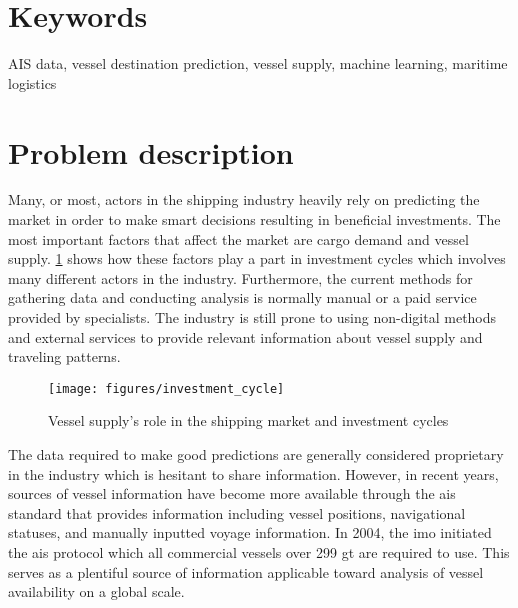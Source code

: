 \section{Keywords}

AIS data, vessel destination prediction, vessel supply, machine learning, maritime logistics

\section{Problem description}
\label{sec:problem_desc}

Many, or most, actors in the shipping industry heavily rely on predicting the market in order to make smart decisions resulting in beneficial investments. The most important factors that affect the market are cargo demand and vessel supply. \cref{fig:maritime_economics} shows how these factors play a part in investment cycles which involves many different actors in the industry. Furthermore, the current methods for gathering data and conducting analysis is normally manual or a paid service provided by specialists. The industry is still prone to using non-digital methods and external services to provide relevant information about vessel supply and traveling patterns.

\begin{figure}[htbp]
    \centering
    \texttt{[image: figures/investment\_cycle]}
    \caption{Vessel supply’s role in the shipping market and investment cycles \parencite{stopford2008}}
    \label{fig:maritime_economics}
\end{figure}

The data required to make good predictions are generally considered proprietary in the industry which is hesitant to share information. However, in recent years, sources of vessel information have become more available through the \acrshort{ais} standard that provides information including vessel positions, navigational statuses, and manually inputted \gls{voyage} information. In 2004, the \acrfull{imo} initiated the \acrshort{ais} protocol which all commercial vessels over 299 \acrfull{gt} are required to use. This serves as a plentiful source of information applicable toward analysis of vessel availability on a global scale.

